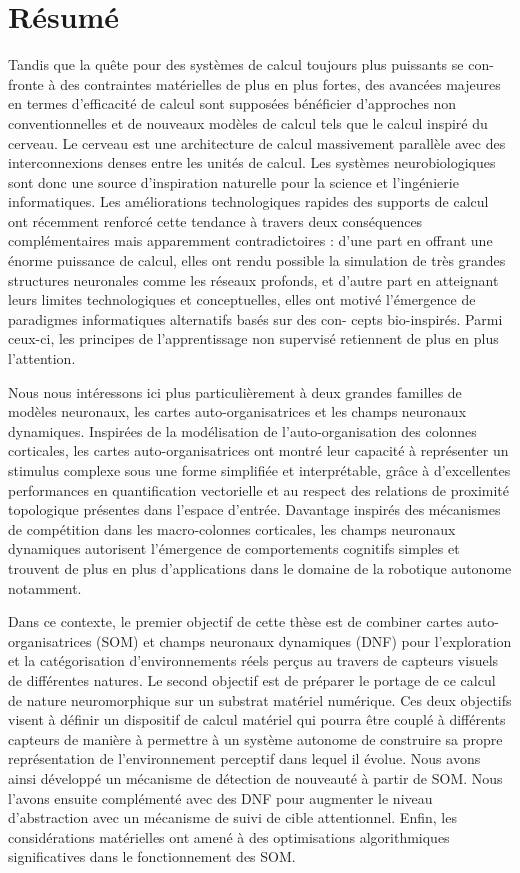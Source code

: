 \chapter*{Résumé}
\markboth{}{}

Tandis que la quête pour des systèmes de calcul toujours plus puissants se con- fronte à des contraintes matérielles de plus en plus fortes, des avancées majeures en termes d’efficacité de calcul sont supposées bénéficier d’approches non conventionnelles et de nouveaux modèles de calcul tels que le calcul inspiré du cerveau. Le cerveau est une architecture de calcul massivement parallèle avec des interconnexions denses entre les unités de calcul. Les systèmes neurobiologiques sont donc une source d'inspiration naturelle pour la science et l'ingénierie informatiques. Les améliorations technologiques rapides des supports de calcul ont récemment renforcé cette tendance à travers deux conséquences complémentaires mais apparemment contradictoires : d’une part en offrant une énorme puissance de calcul, elles ont rendu possible la simulation de très grandes structures neuronales comme les réseaux profonds, et d’autre part en atteignant leurs limites technologiques et conceptuelles, elles ont motivé l'émergence de paradigmes informatiques alternatifs basés sur des con- cepts bio-inspirés. Parmi ceux-ci, les principes de l’apprentissage non supervisé retiennent de plus en plus l’attention. 

Nous nous intéressons ici plus particulièrement à deux grandes familles de modèles neuronaux, les cartes auto-organisatrices et les champs neuronaux dynamiques. Inspirées de la modélisation de l’auto-organisation des colonnes corticales, les cartes auto-organisatrices ont montré leur capacité à représenter un stimulus complexe sous une forme simplifiée et interprétable, grâce à d’excellentes performances en quantification vectorielle et au respect des relations de proximité topologique présentes dans l’espace d’entrée. Davantage inspirés des mécanismes de compétition dans les macro-colonnes corticales, les champs neuronaux dynamiques autorisent l’émergence de comportements cognitifs simples et trouvent de plus en plus d’applications dans le domaine de la robotique autonome notamment.

Dans ce contexte, le premier objectif de cette thèse est de combiner cartes auto-organisatrices (SOM) et champs neuronaux dynamiques (DNF) pour l’exploration et la catégorisation d’environnements réels perçus au travers de capteurs visuels de différentes natures. Le second objectif est de préparer le portage de ce calcul de nature neuromorphique sur un substrat matériel numérique. Ces deux objectifs visent à définir un dispositif de calcul matériel qui pourra être couplé à différents capteurs de manière à permettre à un système autonome de construire sa propre représentation de l’environnement perceptif dans lequel il évolue. Nous avons ainsi développé un mécanisme de détection de nouveauté à partir de SOM. Nous l'avons ensuite complémenté avec des DNF pour augmenter le niveau d'abstraction avec un mécanisme de suivi de cible attentionnel. Enfin, les considérations matérielles ont amené à des optimisations algorithmiques significatives dans le fonctionnement des SOM.


